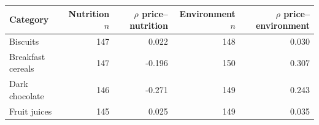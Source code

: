 \begin{tabular}{lrrrr}
\toprule
Category & Nutrition $n$ & $\rho$ price--nutrition & Environment $n$ & $\rho$ price--environment \\
\midrule
Biscuits & 147 & 0.022 & 148 & 0.030 \\
Breakfast cereals & 147 & -0.196 & 150 & 0.307 \\
Dark chocolate & 146 & -0.271 & 149 & 0.243 \\
Fruit juices & 145 & 0.025 & 149 & 0.035 \\
\bottomrule
\end{tabular}
